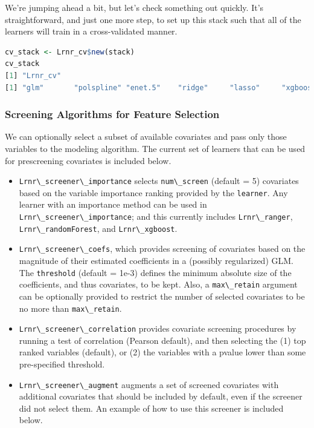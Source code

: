 \documentclass[
  12pt, krantz2,
]{krantz}
\newcommand{\passthrough}[1]{#1}
\providecommand{\tightlist}{%
  \setlength{\itemsep}{0pt}\setlength{\parskip}{0pt}}
\newcommand{\1}{\mathbbm{1}}
\theoremstyle{definition}
\theoremstyle{definition}
\theoremstyle{definition}
\theoremstyle{definition}
\theoremstyle{remark}
\begin{document}
We're jumping ahead a bit, but let's check something out quickly. It's
straightforward, and just one more step, to set up this stack such that
all of the learners will train in a cross-validated manner.

\begin{lstlisting}[language=R]
cv_stack <- Lrnr_cv$new(stack)
cv_stack
[1] "Lrnr_cv"
[1] "glm"       "polspline" "enet.5"    "ridge"     "lasso"     "xgboost50"
\end{lstlisting}

\hypertarget{screening-algorithms-for-feature-selection}{%
\subsubsection*{Screening Algorithms for Feature Selection}\label{screening-algorithms-for-feature-selection}}


We can optionally select a subset of available covariates and pass only
those variables to the modeling algorithm. The current set of learners that
can be used for prescreening covariates is included below.

\begin{itemize}
\tightlist
\item
  \passthrough{\lstinline!Lrnr\_screener\_importance!} selects \passthrough{\lstinline!num\_screen!} (default = 5) covariates
  based on the variable importance ranking provided by the \passthrough{\lstinline!learner!}. Any
  learner with an importance method can be used in \passthrough{\lstinline!Lrnr\_screener\_importance!};
  and this currently includes \passthrough{\lstinline!Lrnr\_ranger!}, \passthrough{\lstinline!Lrnr\_randomForest!}, and
  \passthrough{\lstinline!Lrnr\_xgboost!}.
\item
  \passthrough{\lstinline!Lrnr\_screener\_coefs!}, which provides screening of covariates based on the
  magnitude of their estimated coefficients in a (possibly regularized) GLM.
  The \passthrough{\lstinline!threshold!} (default = 1e-3) defines the minimum absolute size of the
  coefficients, and thus covariates, to be kept. Also, a \passthrough{\lstinline!max\_retain!} argument
  can be optionally provided to restrict the number of selected covariates to be
  no more than \passthrough{\lstinline!max\_retain!}.
\item
  \passthrough{\lstinline!Lrnr\_screener\_correlation!} provides covariate screening procedures by
  running a test of correlation (Pearson default), and then selecting the (1)
  top ranked variables (default), or (2) the variables with a pvalue lower than
  some pre-specified threshold.
\item
  \passthrough{\lstinline!Lrnr\_screener\_augment!} augments a set of screened covariates with additional
  covariates that should be included by default, even if the screener did not
  select them. An example of how to use this screener is included below.
\end{itemize}
\end{document}
